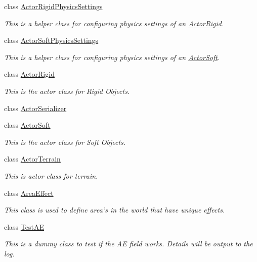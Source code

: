 \begin{DoxyCompactItemize}
class \hyperlink{classphys_1_1ActorRigidPhysicsSettings}{ActorRigidPhysicsSettings}
\begin{DoxyCompactList}\small\item\em This is a helper class for configuring physics settings of an \hyperlink{classphys_1_1ActorRigid}{ActorRigid}. \item\end{DoxyCompactList}\item 
class \hyperlink{classphys_1_1ActorSoftPhysicsSettings}{ActorSoftPhysicsSettings}
\begin{DoxyCompactList}\small\item\em This is a helper class for configuring physics settings of an \hyperlink{classphys_1_1ActorSoft}{ActorSoft}. \item\end{DoxyCompactList}\item 
class \hyperlink{classphys_1_1ActorRigid}{ActorRigid}
\begin{DoxyCompactList}\small\item\em This is the actor class for Rigid Objects. \item\end{DoxyCompactList}\item 
class \hyperlink{classphys_1_1ActorSerializer}{ActorSerializer}
\item 
class \hyperlink{classphys_1_1ActorSoft}{ActorSoft}
\begin{DoxyCompactList}\small\item\em This is the actor class for Soft Objects. \item\end{DoxyCompactList}\item 
class \hyperlink{classphys_1_1ActorTerrain}{ActorTerrain}
\begin{DoxyCompactList}\small\item\em This is actor class for terrain. \item\end{DoxyCompactList}\item 
class \hyperlink{classphys_1_1AreaEffect}{AreaEffect}
\begin{DoxyCompactList}\small\item\em This class is used to define area's in the world that have unique effects. \item\end{DoxyCompactList}\item 
class \hyperlink{classphys_1_1TestAE}{TestAE}
\begin{DoxyCompactList}\small\item\em This is a dummy class to test if the AE field works. Details will be output to the log. \item\end{DoxyCompactList}\item 

\end{DoxyCompactItemize}
